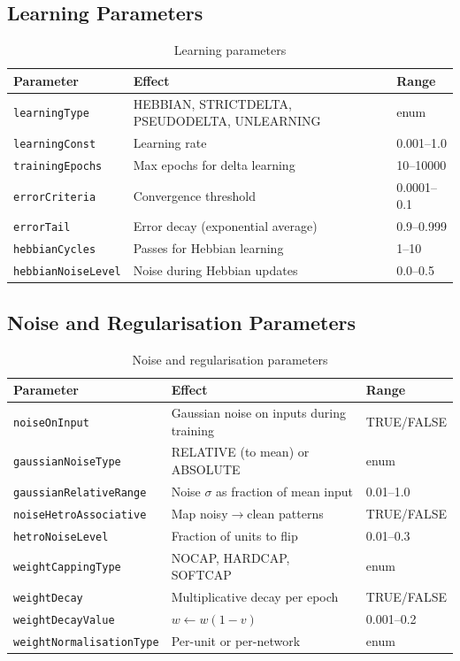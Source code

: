\documentclass[11pt,a4paper]{article}
\begin{document}
\subsection{Learning Parameters}
\begin{table}[h]
\centering\small
\begin{tabular}{lp{5cm}l}
\toprule
\textbf{Parameter} & \textbf{Effect} & \textbf{Range} \\
\midrule
\texttt{learningType} & HEBBIAN, STRICTDELTA, PSEUDODELTA, UNLEARNING & enum \\
\texttt{learningConst} & Learning rate & 0.001--1.0 \\
\texttt{trainingEpochs} & Max epochs for delta learning & 10--10000 \\
\texttt{errorCriteria} & Convergence threshold & 0.0001--0.1 \\
\texttt{errorTail} & Error decay (exponential average) & 0.9--0.999 \\
\texttt{hebbianCycles} & Passes for Hebbian learning & 1--10 \\
\texttt{hebbianNoiseLevel} & Noise during Hebbian updates & 0.0--0.5 \\
\bottomrule
\end{tabular}
\caption{Learning parameters}
\end{table}

\subsection{Noise and Regularisation Parameters}
\begin{table}[h]
\centering\small
\begin{tabular}{lp{5cm}l}
\toprule
\textbf{Parameter} & \textbf{Effect} & \textbf{Range} \\
\midrule
\texttt{noiseOnInput} & Gaussian noise on inputs during training & TRUE/FALSE \\
\texttt{gaussianNoiseType} & RELATIVE (to mean) or ABSOLUTE & enum \\
\texttt{gaussianRelativeRange} & Noise $\sigma$ as fraction of mean input & 0.01--1.0 \\
\texttt{noiseHetroAssociative} & Map noisy$\rightarrow$clean patterns & TRUE/FALSE \\
\texttt{hetroNoiseLevel} & Fraction of units to flip & 0.01--0.3 \\
\texttt{weightCappingType} & NOCAP, HARDCAP, SOFTCAP & enum \\
\texttt{weightDecay} & Multiplicative decay per epoch & TRUE/FALSE \\
\texttt{weightDecayValue} & $w \leftarrow w(1-v)$ & 0.001--0.2 \\
\texttt{weightNormalisationType} & Per-unit or per-network & enum \\
\bottomrule
\end{tabular}
\caption{Noise and regularisation parameters}
\end{table}
\end{document}

